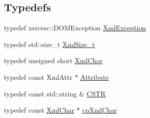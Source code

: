 \subsection*{Typedefs}
\begin{DoxyCompactItemize}
\item 
typedef xercesc::DOMException \hyperlink{namespace_d_d4hep_1_1_x_m_l_a60be75f70ac155f3f1a92aa1c69f085b}{XmlException}
\item 
typedef std::size\_\-t \hyperlink{namespace_d_d4hep_1_1_x_m_l_a0509adb4703e562548dcd1df5301f38d}{XmlSize\_\-t}
\item 
typedef unsigned short \hyperlink{namespace_d_d4hep_1_1_x_m_l_a09e5d9cc86ed782f6826dfe0778c1815}{XmlChar}
\item 
typedef const XmlAttr $\ast$ \hyperlink{namespace_d_d4hep_1_1_x_m_l_a5c19b7116be99d69b4b22d911357baaf}{Attribute}
\item 
typedef const std::string \& \hyperlink{namespace_d_d4hep_1_1_x_m_l_a4b167ca6b4f6763654721aef89a7089c}{CSTR}
\item 
typedef const \hyperlink{namespace_d_d4hep_1_1_x_m_l_a09e5d9cc86ed782f6826dfe0778c1815}{XmlChar} $\ast$ \hyperlink{namespace_d_d4hep_1_1_x_m_l_a55d8459973c11d7c20ba5a1d7ef1242c}{cpXmlChar}
\end{DoxyCompactItemize}
